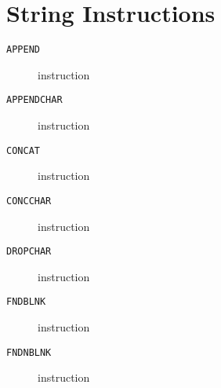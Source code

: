 \section{String Instructions}
\begin{description}
\item[\texttt{APPEND}] instruction\\

\end{description}
\clearpage
\begin{description}
\item[\texttt{APPENDCHAR}] instruction\\

\end{description}
\clearpage
\begin{description}
\item[\texttt{CONCAT}] instruction\\

\end{description}
\clearpage
\begin{description}
\item[\texttt{CONCCHAR}] instruction\\

\end{description}
\clearpage
\begin{description}
\item[\texttt{DROPCHAR}] instruction\\

\end{description}
\clearpage
\begin{description}
\item[\texttt{FNDBLNK}] instruction\\

\end{description}
\clearpage
\begin{description}
\item[\texttt{FNDNBLNK}] instruction\\

\end{description}
